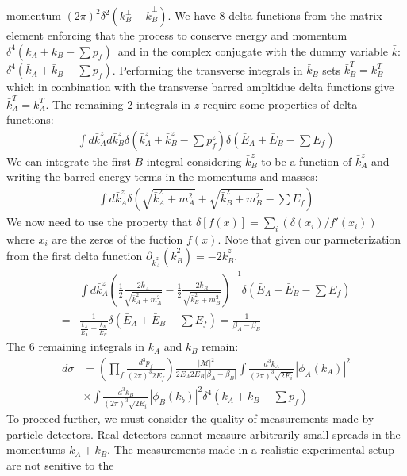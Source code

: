 momentum $(2\pi)^2 \delta^2(k_B^\perp - \bar{k}_B^\perp)$.  We have 8 delta functions from 
the matrix element enforcing that the process to conserve energy and momentum
 $\delta^4(k_A +k_B - \sum p_f)$\ and in the complex conjugate with the dummy variable
 $\bar{k}$: $\delta^4(\bar{k}_A + \bar{k}_B - \sum p_f)$. Performing the transverse 
integrals in $\bar{k}_B$ sets $\bar{k}_B^T=k_B^T$ which in combination with the transverse
 barred ampltidue delta functions give $\bar{k}_A^T = k_A^T$. The remaining 2 integrals in $z$ require some properties of delta functions:
\begin{align*}
\int d \bar{k}_A^z d \bar{k}_B^z \delta( \bar{k}^z_A + \bar{k}^z_B  - \sum p_f^z) \delta (\bar{E}_A + \bar{E}_B - \sum E_f) 
\end{align*}
We can integrate the first $B$ integral considering $\bar{k}_B^z$ to be a function of
$\bar{k}_A^z$ and writing the barred energy terms in the momentums and masses:
\begin{align*}
\int d\bar{k}_A^z  \delta \left (\sqrt{\bar{k}_A^2 +m_A^2}  + \sqrt{\bar{k}_B^2 + m_B^2} - \sum E_f \right) 
\end{align*}
We now need to use the property that $\delta[f(x)] = \sum_i (\delta(x_i) / f'(x_i))$ where $x_i$ are the zeros of the fuction $f(x)$. Note that given our parmeterization from the first delta function $\partial_{\bar{k}_A^z}(\bar{k}_B^2) = - 2 \bar{k}_B^z$.
\begin{align*}
&\int d\bar{k}_A^z  \left (\frac{1}{2} \frac{2\bar{k}_A}{\sqrt{\bar{k}_A^2 +m_A^2}}
 - \frac{1}{2} \frac{2\bar{k}_B}{\sqrt{\bar{k}_B^2 +m_B^2}} \right )^{-1}\delta(\bar{E}_A
 + \bar{E}_B - \sum E_f) \\
= &\frac{1}{\frac{\bar{k}_A}{\bar{E}_A}- \frac{\bar{k}_B}{\bar{E}_B}}
 \delta(\bar{E}_A + \bar{E}_B - \sum E_f) = \frac{1}{\beta_A - \beta_B}
\end{align*}
The 6 remaining integrals in $k_A$ and $k_B$ remain:
\begin{align*}
d\sigma &= \left( \prod_f \frac{d^3p_f}{(2\pi)^3 2E_f} \right ) \frac{|\mathcal{M}|^2}{2E_A2E_B|\beta_A - \beta_B|}
 \int \frac{d^3 k_A }{(2\pi)^3 \sqrt{2E_i}} |\phi_A(k_A)|^2 \\ 
&\times  \int \frac{d^3 k_B }{(2\pi)^3 \sqrt{2E_i}} |\phi_B(k_b)|^2 \delta^4( k_A + k_B - \sum p_f)
\end{align*}
To proceed further, we must consider the quality of measurements made by particle detectors. 
Real detectors cannot measure arbitrarily small spreads in the momentums $k_A+k_B$. 
The measurements made in a realistic experimental setup are not senitive to the
